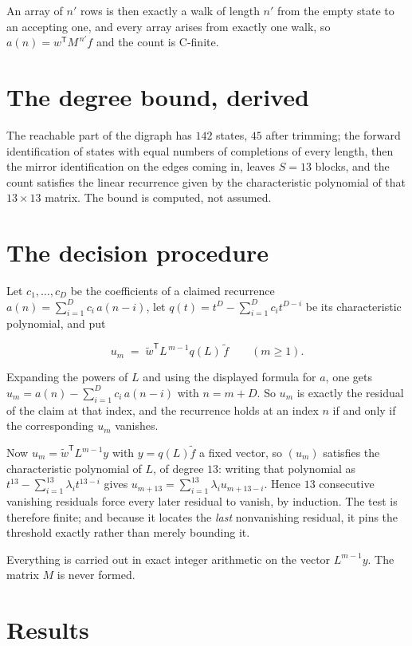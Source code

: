 \documentclass[11pt]{article}
\theoremstyle{definition}
\begin{document}
An array of $n'$ rows is then exactly a walk of length $n'$ from the empty state to an accepting one, and every array arises from exactly one walk, so $a(n) = w^{\mathsf T}M^{\,n'}f$ and the count is C-finite.

\section{The degree bound, derived}

The reachable part of the digraph has $142$ states, $45$ after trimming; the forward identification of states with equal numbers of completions of every length, then the mirror identification on the edges coming in, leaves $S = 13$ blocks, and the count satisfies the linear recurrence given by the characteristic polynomial of that $13\times13$ matrix. The bound is computed, not assumed.

\section{The decision procedure}

Let $c_1,\dots,c_D$ be the coefficients of a claimed recurrence $a(n) = \sum_{i=1}^{D} c_i\,a(n-i)$, let $q(t) = t^{D} - \sum_{i=1}^{D} c_i t^{D-i}$ be its characteristic polynomial, and put

\[u_m \;=\; \tilde w^{\mathsf T} L^{\,m-1} q(L)\,\tilde f \qquad (m \ge 1).\]

Expanding the powers of $L$ and using the displayed formula for $a$, one gets $u_m = a(n) - \sum_{i=1}^{D} c_i\,a(n-i)$ with $n = m + D$. So $u_m$ is exactly the residual of the claim at that index, and the recurrence holds at an index $n$ if and only if the corresponding $u_m$ vanishes.

Now $u_m = \tilde w^{\mathsf T} L^{m-1} y$ with $y = q(L)\tilde f$ a fixed vector, so $(u_m)$ satisfies the characteristic polynomial of $L$, of degree $13$: writing that polynomial as $t^{13} - \sum_{i=1}^{13} \lambda_i t^{13-i}$ gives $u_{m+13} = \sum_{i=1}^{13} \lambda_i u_{m+13-i}$. Hence $13$ consecutive vanishing residuals force every later residual to vanish, by induction. The test is therefore finite; and because it locates the {\itshape last} nonvanishing residual, it pins the threshold exactly rather than merely bounding it.

Everything is carried out in exact integer arithmetic on the vector $L^{m-1}y$. The matrix $M$ is never formed.

\section{Results}
\end{document}
